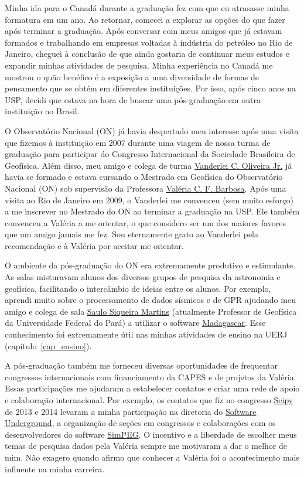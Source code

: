 \documentclass[10pt,a4paper,oneside]{book}
\begin{document}
Minha ida para o Canadá durante a graduação fez com que eu atrasasse minha
formatura em um ano.
Ao retornar, comecei a explorar as opções do que fazer após terminar a
graduação.
Após conversar com meus amigos que já estavam formados e trabalhando em
empresas voltadas à indústria do petróleo no Rio de Janeiro, cheguei à
conclusão de que ainda gostaria de continuar meus estudos e expandir minhas
atividades de pesquisa.
Minha experiência no Canadá me mostrou o quão benéfico é a exposição a uma
diversidade de formas de pensamento que se obtém em diferentes instituições.
Por isso, após cinco anos na USP, decidi que estava na hora de buscar uma
pós-graduação em outra instituição no Brasil.

O Observatório Nacional (ON) já havia despertado meu interesse após uma visita
que fizemos à instituição em 2007 durante uma viagem de nossa turma de
graduação para participar do Congresso Internacional da Sociedade Brasileira de
Geofísica.
Além disso, meu amigo e colega de turma
\href{https://www.pinga-lab.org/people/oliveira-jr.html}{Vanderlei C. Oliveira Jr.}
já havia se formado e estava cursando o Mestrado em Geofísica do Observatório
Nacional (ON) sob supervisão da Professora
\href{https://www.pinga-lab.org/people/barbosa.html}{Valéria C. F. Barbosa}.
Após uma visita ao Rio de Janeiro em 2009, o Vanderlei me convenceu (sem muito
esforço) a me inscrever no Mestrado do ON ao terminar a graduação na USP.
Ele também convenceu a Valéria a me orientar, o que considero ser um dos
maiores favores que um amigo jamais me fez.
Sou eternamente grato ao Vanderlei pela recomendação e à Valéria por aceitar me
orientar.

O ambiente da pós-graduação do ON era extremamente produtivo e estimulante.
As salas misturavam alunos dos diversos grupos de pesquisa da astronomia e
geofísica, facilitando o intercâmbio de ideias entre os alunos.
Por exemplo, aprendi muito sobre o processamento de dados sísmicos e de GPR
ajudando meu amigo e colega de sala
\href{https://www.linkedin.com/in/saulo-siqueira-martins-78770878/}{Saulo Siqueira Martins}
(atualmente Professor de Geofísica da Universidade Federal do Pará)
a utilizar o software \href{https://www.reproducibility.org/}{Madagascar}.
Esse conhecimento foi extremamente útil nas minhas atividades de ensino na
UERJ (capítulo~\ref{cap_ensino}).

A pós-graduação também me forneceu diversas oportunidades de frequentar
congressos internacionais com financiamento da CAPES e de projetos da Valéria.
Essas participações me ajudaram a estabelecer contatos e criar uma rede de
apoio e colaboração internacional.
Por exemplo, os contatos que fiz no congresso
\href{https://conference.scipy.org/scipy2014/}{Scipy} de 2013 e 2014 levaram a
minha participação na diretoria do
\href{https://softwareunderground.org/}{Software Underground}, a organização
de seções em congressos e colaborações com os desenvolvedores do software
\href{https://simpeg.xyz/}{SimPEG}.
O incentivo e a liberdade de escolher meus temas de pesquisa dados pela Valéria
sempre me motivaram a dar o melhor de mim.
Não exagero quando afirmo que conhecer a Valéria foi o acontecimento mais
influente na minha carreira.
\end{document}
